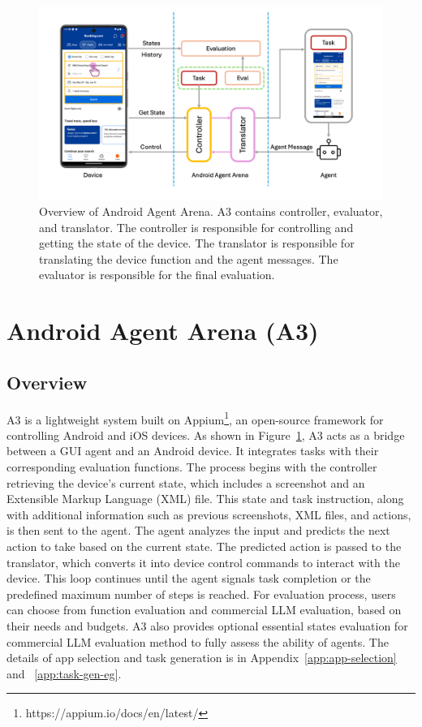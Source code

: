 \documentclass[11pt]{article}
\begin{document}
\begin{figure}
    \centering
    \includegraphics[width=0.9\linewidth]{images/pipeline.png}
    \caption{Overview of Android Agent Arena. A3 contains controller, evaluator, and translator. The controller is responsible for controlling and getting the state of the device. The translator is responsible for translating the device function and the agent messages. The evaluator is responsible for the final evaluation.}
    \label{fig:pipeline}
\end{figure}

\section{Android Agent Arena (A3)}

\subsection{Overview}

A3 is a lightweight system built on Appium\footnote{https://appium.io/docs/en/latest/}, an open-source framework for controlling Android and iOS devices. As shown in Figure~\ref{fig:pipeline}, A3 acts as a bridge between a GUI agent and an Android device. It integrates tasks with their corresponding evaluation functions. The process begins with the controller retrieving the device's current state, which includes a screenshot and an Extensible Markup Language (XML) file. This state and task instruction, along with additional information such as previous screenshots, XML files, and actions, is then sent to the agent. The agent analyzes the input and predicts the next action to take based on the current state. The predicted action is passed to the translator, which converts it into device control commands to interact with the device. This loop continues until the agent signals task completion or the predefined maximum number of steps is reached. For evaluation process, users can choose from function evaluation and commercial LLM evaluation, based on their needs and budgets. A3 also provides optional essential states evaluation for commercial LLM evaluation method to fully assess the ability of agents. The details of app selection and task generation is in Appendix~\ref{app:app-selection} and ~\ref{app:task-gen-eg}.
\end{document}
